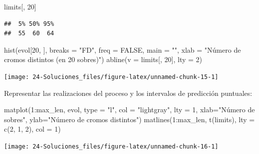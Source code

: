 \documentclass[
]{book}
\newenvironment{Shaded}{\begin{snugshade}}{\end{snugshade}}
\newcommand{\AttributeTok}[1]{\textcolor[rgb]{0.77,0.63,0.00}{#1}}
\newcommand{\ConstantTok}[1]{\textcolor[rgb]{0.00,0.00,0.00}{#1}}
\newcommand{\DecValTok}[1]{\textcolor[rgb]{0.00,0.00,0.81}{#1}}
\newcommand{\FunctionTok}[1]{\textcolor[rgb]{0.00,0.00,0.00}{#1}}
\newcommand{\NormalTok}[1]{#1}
\newcommand{\SpecialCharTok}[1]{\textcolor[rgb]{0.00,0.00,0.00}{#1}}
\newcommand{\StringTok}[1]{\textcolor[rgb]{0.31,0.60,0.02}{#1}}
\theoremstyle{break}
\theoremstyle{nonumberplain}
\begin{document}
\begin{Shaded}
\begin{Highlighting}[]
\NormalTok{limits[, }\DecValTok{20}\NormalTok{]}
\end{Highlighting}
\end{Shaded}

\begin{verbatim}
##  5% 50% 95% 
##  55  60  64
\end{verbatim}

\begin{Shaded}
\begin{Highlighting}[]
\FunctionTok{hist}\NormalTok{(evol[}\DecValTok{20}\NormalTok{, ], }\AttributeTok{breaks =} \StringTok{"FD"}\NormalTok{, }\AttributeTok{freq =} \ConstantTok{FALSE}\NormalTok{,}
     \AttributeTok{main =} \StringTok{""}\NormalTok{, }\AttributeTok{xlab =} \StringTok{"Número de cromos distintos (en 20 sobres)"}\NormalTok{)}
\FunctionTok{abline}\NormalTok{(}\AttributeTok{v =}\NormalTok{ limits[, }\DecValTok{20}\NormalTok{], }\AttributeTok{lty =} \DecValTok{2}\NormalTok{)}
\end{Highlighting}
\end{Shaded}

\begin{center}\texttt{[image: 24-Soluciones\_files/figure-latex/unnamed-chunk-15-1]} \end{center}

Representar las realizaciones del proceso y los intervalos de predicción puntuales:

\begin{Shaded}
\begin{Highlighting}[]
\FunctionTok{matplot}\NormalTok{(}\DecValTok{1}\SpecialCharTok{:}\NormalTok{max\_len, evol, }\AttributeTok{type =} \StringTok{"l"}\NormalTok{, }\AttributeTok{col =} \StringTok{"lightgray"}\NormalTok{, }\AttributeTok{lty =} \DecValTok{1}\NormalTok{,}
    \AttributeTok{xlab=}\StringTok{"Número de sobres"}\NormalTok{, }\AttributeTok{ylab=}\StringTok{"Número de cromos distintos"}\NormalTok{)}
\FunctionTok{matlines}\NormalTok{(}\DecValTok{1}\SpecialCharTok{:}\NormalTok{max\_len, }\FunctionTok{t}\NormalTok{(limits), }\AttributeTok{lty =} \FunctionTok{c}\NormalTok{(}\DecValTok{2}\NormalTok{, }\DecValTok{1}\NormalTok{, }\DecValTok{2}\NormalTok{), }\AttributeTok{col =} \DecValTok{1}\NormalTok{)}
\end{Highlighting}
\end{Shaded}

\begin{center}\texttt{[image: 24-Soluciones\_files/figure-latex/unnamed-chunk-16-1]} \end{center}
\end{document}
